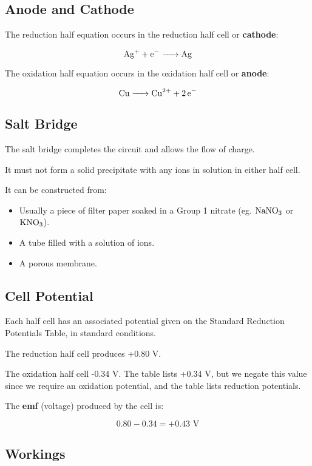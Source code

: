\documentclass[a4paper,11pt]{article}
\begin{document}
\subsection{Anode and Cathode}

The reduction half equation occurs in the reduction half cell or
\textbf{cathode}:

$$
\ce{Ag+ + e- -> Ag}
$$

The oxidation half equation occurs in the oxidation half cell or
\textbf{anode}:

$$
\ce{Cu -> Cu^{2+} + 2e-}
$$

\subsection{Salt Bridge}

The salt bridge completes the circuit and allows the flow of charge.

It must not form a solid precipitate with any ions in solution in either half
cell.

It can be constructed from:

\begin{itemize}
\item Usually a piece of filter paper soaked in a Group 1 nitrate (eg.
	$\ce{NaNO3}$ or $\ce{KNO3}$).
\item A tube filled with a solution of ions.
\item A porous membrane.
\end{itemize}

\subsection{Cell Potential}

Each half cell has an associated potential given on the Standard Reduction
Potentials Table, in standard conditions.

The reduction half cell produces +0.80 V.

The oxidation half cell -0.34 V. The table lists +0.34 V, but we negate this
value since we require an oxidation potential, and the table lists reduction
potentials.

The \textbf{emf} (voltage) produced by the cell is:

$$
0.80 - 0.34 = +0.43\text{ V}
$$

\subsection{Workings}
\end{document}
